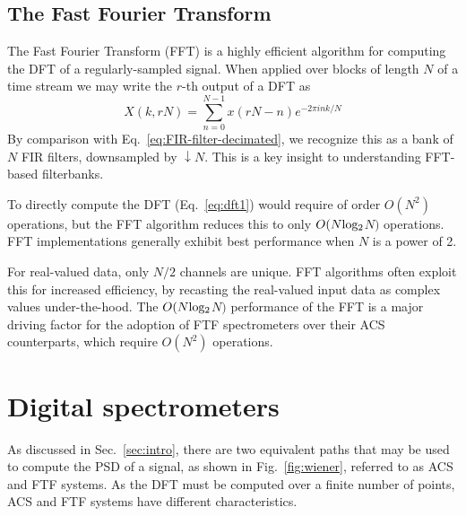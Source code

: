 \documentclass{ws-rv961x669}
\begin{document}
\subsection{The Fast Fourier Transform\label{sub:fft}}

The Fast Fourier Transform\cite{Cooley1965, BookBrighamFFT} (FFT) is a highly efficient algorithm for computing the DFT of a regularly-sampled signal. When applied over blocks of length $N$ of a time stream we may write the $r$-th output of a DFT as
\begin{equation}
X(k, rN)=\sum_{n=0}^{N-1}x(rN-n)e^{-2\pi ink/N}\label{eq:dft1}
\end{equation}
By comparison with Eq.~\ref{eq:FIR-filter-decimated}, we recognize this as a bank of $N$ FIR filters, downsampled by $\downarrow N$. This is a key insight to understanding FFT-based filterbanks.

To directly compute the DFT (Eq.~\ref{eq:dft1})
would require of order $O(N^2)$ operations, but the FFT algorithm reduces this to only $O(N \rm{log_2}$$N)$ operations. FFT implementations generally exhibit best performance when $N$ is a power of 2. 

For real-valued data, only $N/2$ channels are unique. FFT algorithms often exploit this for increased efficiency, by recasting the real-valued input data as complex values under-the-hood. The  $O(N \rm{log_2}$$N)$ performance of the FFT is a major driving factor for the adoption of FTF spectrometers over their ACS counterparts, which require $O(N^2)$ operations. 



\section{Digital spectrometers}
As discussed in Sec.~\ref{sec:intro}, there are two equivalent paths that may be used to compute the PSD of a signal, as shown in  Fig.~\ref{fig:wiener}, referred to as ACS and FTF systems. As the DFT must be computed over a finite number of points, ACS and FTF systems have different characteristics. 
\end{document}
